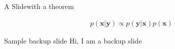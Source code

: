 \documentclass[presentation]{beamer}
\begin{document}
%
%

\begin{frame}{A Slide}{with a theorem}

  \begin{theorem}[Bayes]
    \vspace{-2em}
    \begin{align*}
    p(\mathbf{x}|\mathbf{y}) \propto p(\mathbf{y}|\mathbf{x})p(\mathbf{x})%
    \end{align*}
  \end{theorem}

\end{frame}

\appendix


\begin{frame}{Sample backup slide}
  Hi, I am a backup slide
\end{frame}
\end{document}
